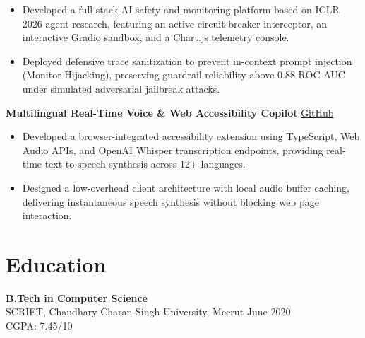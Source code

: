 \documentclass[10pt,a4paper]{article}
\newcommand{\projectheading}[3]{
  \textbf{#1} \hfill
  \href{#2}{#3}\\[-2pt]
}
\begin{document}
\begin{itemize}
  \item Developed a full-stack AI safety and monitoring platform based on ICLR 2026 agent research, featuring an active circuit-breaker interceptor, an interactive Gradio sandbox, and a Chart.js telemetry console.
  \item Deployed defensive trace sanitization to prevent in-context prompt injection (Monitor Hijacking), preserving guardrail reliability above 0.88 ROC-AUC under simulated adversarial jailbreak attacks.
\end{itemize}

\medskip

\projectheading
  {Multilingual Real-Time Voice \& Web Accessibility Copilot}
  {https://github.com/sakshi-labs/textToSpeech}
  {GitHub}

\begin{itemize}
  \item Developed a browser-integrated accessibility extension using TypeScript, Web Audio APIs, and OpenAI Whisper transcription endpoints, providing real-time text-to-speech synthesis across 12+ languages.
  \item Designed a low-overhead client architecture with local audio buffer caching, delivering instantaneous speech synthesis without blocking web page interaction.
\end{itemize}


\section{Education}

\textbf{B.Tech in Computer Science}\\
SCRIET, Chaudhary Charan Singh University, Meerut
\hfill June 2020\\
CGPA: 7.45/10
\end{document}
